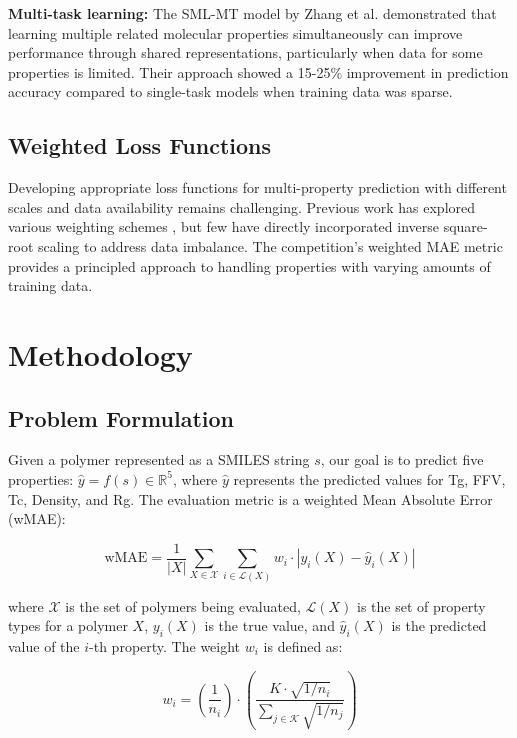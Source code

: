 \documentclass[10pt,twocolumn,letterpaper]{article}
\begin{document}
\textbf{Multi-task learning:} The SML-MT model by Zhang et al. \cite{zhang2021} demonstrated that learning multiple related molecular properties simultaneously can improve performance through shared representations, particularly when data for some properties is limited. Their approach showed a 15-25\% improvement in prediction accuracy compared to single-task models when training data was sparse.

\subsection{Weighted Loss Functions}

Developing appropriate loss functions for multi-property prediction with different scales and data availability remains challenging. Previous work has explored various weighting schemes \cite{wang2020}, but few have directly incorporated inverse square-root scaling to address data imbalance. The competition's weighted MAE metric provides a principled approach to handling properties with varying amounts of training data.

\section{Methodology}

\subsection{Problem Formulation}

Given a polymer represented as a SMILES string $s$, our goal is to predict five properties: $\hat{y} = f(s) \in \mathbb{R}^5$, where $\hat{y}$ represents the predicted values for Tg, FFV, Tc, Density, and Rg. The evaluation metric is a weighted Mean Absolute Error (wMAE):

\begin{equation}
\text{wMAE} = \frac{1}{|X|} \sum_{X \in \mathcal{X}} \sum_{i \in \mathcal{L}(X)} w_i \cdot |y_i(X) - \hat{y}_i(X)|
\end{equation}

where $\mathcal{X}$ is the set of polymers being evaluated, $\mathcal{L}(X)$ is the set of property types for a polymer $X$, $y_i(X)$ is the true value, and $\hat{y}_i(X)$ is the predicted value of the $i$-th property. The weight $w_i$ is defined as:

\begin{equation}
w_i = \left(\frac{1}{n_i}\right) \cdot \left(\frac{K \cdot \sqrt{1/n_i}}{\sum_{j \in \mathcal{K}} \sqrt{1/n_j}}\right)
\end{equation}
\end{document}

